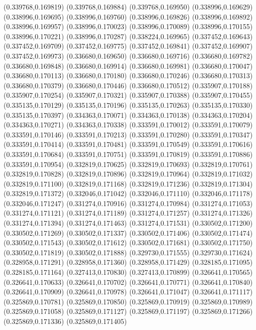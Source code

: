 (0.339768,0.169819)
(0.339768,0.169884)
(0.339768,0.169950)
(0.338996,0.169629)
(0.338996,0.169695)
(0.338996,0.169760)
(0.338996,0.169826)
(0.338996,0.169892)
(0.338996,0.169957)
(0.338996,0.170023)
(0.338996,0.170089)
(0.338996,0.170155)
(0.338996,0.170221)
(0.338996,0.170287)
(0.338224,0.169965)
(0.337452,0.169643)
(0.337452,0.169709)
(0.337452,0.169775)
(0.337452,0.169841)
(0.337452,0.169907)
(0.337452,0.169973)
(0.336680,0.169650)
(0.336680,0.169716)
(0.336680,0.169782)
(0.336680,0.169848)
(0.336680,0.169914)
(0.336680,0.169981)
(0.336680,0.170047)
(0.336680,0.170113)
(0.336680,0.170180)
(0.336680,0.170246)
(0.336680,0.170313)
(0.336680,0.170379)
(0.336680,0.170446)
(0.336680,0.170512)
(0.335907,0.170188)
(0.335907,0.170254)
(0.335907,0.170321)
(0.335907,0.170388)
(0.335907,0.170455)
(0.335135,0.170129)
(0.335135,0.170196)
(0.335135,0.170263)
(0.335135,0.170330)
(0.335135,0.170397)
(0.334363,0.170071)
(0.334363,0.170138)
(0.334363,0.170204)
(0.334363,0.170271)
(0.334363,0.170338)
(0.333591,0.170012)
(0.333591,0.170079)
(0.333591,0.170146)
(0.333591,0.170213)
(0.333591,0.170280)
(0.333591,0.170347)
(0.333591,0.170414)
(0.333591,0.170481)
(0.333591,0.170549)
(0.333591,0.170616)
(0.333591,0.170684)
(0.333591,0.170751)
(0.333591,0.170819)
(0.333591,0.170886)
(0.333591,0.170954)
(0.332819,0.170625)
(0.332819,0.170693)
(0.332819,0.170761)
(0.332819,0.170828)
(0.332819,0.170896)
(0.332819,0.170964)
(0.332819,0.171032)
(0.332819,0.171100)
(0.332819,0.171168)
(0.332819,0.171236)
(0.332819,0.171304)
(0.332819,0.171372)
(0.332046,0.171042)
(0.332046,0.171110)
(0.332046,0.171178)
(0.332046,0.171247)
(0.331274,0.170916)
(0.331274,0.170984)
(0.331274,0.171053)
(0.331274,0.171121)
(0.331274,0.171189)
(0.331274,0.171257)
(0.331274,0.171326)
(0.331274,0.171394)
(0.331274,0.171463)
(0.331274,0.171531)
(0.330502,0.171200)
(0.330502,0.171269)
(0.330502,0.171337)
(0.330502,0.171406)
(0.330502,0.171474)
(0.330502,0.171543)
(0.330502,0.171612)
(0.330502,0.171681)
(0.330502,0.171750)
(0.330502,0.171819)
(0.330502,0.171888)
(0.329730,0.171555)
(0.329730,0.171624)
(0.328958,0.171291)
(0.328958,0.171360)
(0.328958,0.171429)
(0.328185,0.171095)
(0.328185,0.171164)
(0.327413,0.170830)
(0.327413,0.170899)
(0.326641,0.170565)
(0.326641,0.170633)
(0.326641,0.170702)
(0.326641,0.170771)
(0.326641,0.170840)
(0.326641,0.170909)
(0.326641,0.170978)
(0.326641,0.171047)
(0.326641,0.171117)
(0.325869,0.170781)
(0.325869,0.170850)
(0.325869,0.170919)
(0.325869,0.170989)
(0.325869,0.171058)
(0.325869,0.171127)
(0.325869,0.171197)
(0.325869,0.171266)
(0.325869,0.171336)
(0.325869,0.171405)
